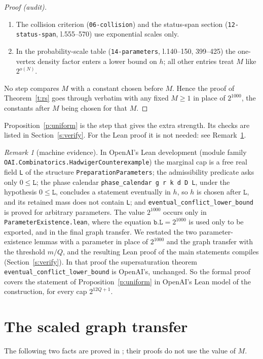 \documentclass[11pt]{article}
\theoremstyle{definition}\newtheorem{conjecture}[theorem]{Conjecture}
\theoremstyle{remark}\newtheorem{remark}[theorem]{Remark}
\begin{document}
\begin{proof}[Proof (audit)]
\begin{enumerate}
(l.77, 184), only through the typicality lemma, with errors $2^{-\Omega(n)}$.
\item The collision criterion (\texttt{06-collision}) and the status-span section (\texttt{12-status-span}, l.555--570) use
exponential scales only.
\item In the probability-scale table (\texttt{14-parameters}, l.140--150, 399--425) the one-vertex density factor enters a
lower bound on $h$; all other entries treat $M$ like $2^{o(N)}$.
\end{enumerate}
No step compares $M$ with a constant chosen before $M$. Hence the proof of Theorem~\ref{t:rs} goes through verbatim with any
fixed $M\ge1$ in place of $2^{1000}$, the constants after $M$ being chosen for that $M$.
\end{proof}

\noindent Proposition~\ref{p:uniform} is the step that gives the extra strength. Its checks are listed in
Section~\ref{s:verify}. For the Lean proof it is not needed: see Remark~\ref{r:lean}.

\begin{remark}[machine evidence]\label{r:lean}
In OpenAI's Lean development \cite{OAIL} (module family \nolinkurl{OAI.Combinatorics.HadwigerCounterexample}) the marginal cap
is a free real field \texttt{L} of the structure \texttt{PreparationParameters}; the admissibility predicate asks only
$0\le\texttt{L}$; the phase calendar \texttt{phase\_calendar g r k d D L}, under the hypothesis $0\le\texttt{L}$, concludes a statement eventually in
$h$, so $h$ is chosen after $\texttt{L}$, and its retained mass does not contain \texttt{L}; and
\texttt{eventual\_conflict\_lower\_bound} is proved for arbitrary parameters. The value $2^{1000}$ occurs only in
\texttt{ParameterExistence.lean}, where the equation $\texttt{b.L}=2^{1000}$ is used only to be exported, and in the final
graph transfer. We restated the two parameter-existence lemmas with a parameter in place of $2^{1000}$ and the graph
transfer with the threshold $m/Q$, and the resulting Lean proof of the main statements compiles
(Section~\ref{s:verify}). In that proof the supersaturation theorem \texttt{eventual\_conflict\_lower\_bound} is OpenAI's,
unchanged. So the formal proof covers the statement of Proposition~\ref{p:uniform} in OpenAI's Lean model of the
construction, for every cap $2^{12Q+1}$.
\end{remark}

\section{The scaled graph transfer}\label{s:transfer}
The following two facts are proved in \cite[Section~3]{OAIH}; their proofs do not use the value of $M$.
\end{document}

